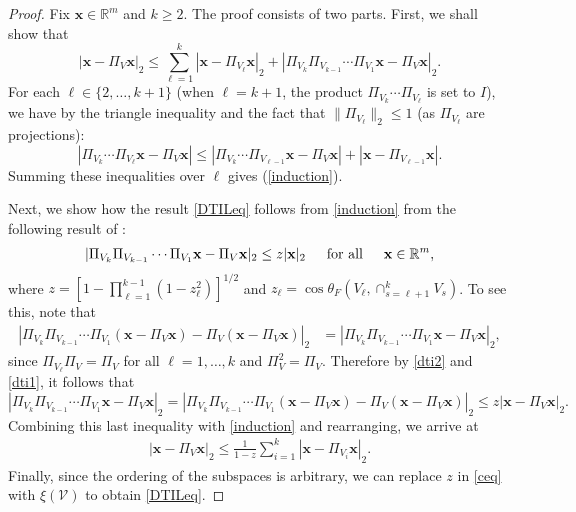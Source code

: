 \documentclass[journal, onecolumn]{IEEEtran}
\begin{document}
\begin{proof} 
Fix $\mathbf{x} \in \mathbb{R}^m$ and $k \geq 2$. The proof consists of two parts. First, we shall show that 
\begin{equation}\label{induction}
|\mathbf{x} - \Pi_V\mathbf{x}|_2 \leq \sum_{\ell=1}^k |\mathbf{x} - \Pi_{V_{\ell}} \mathbf{x}|_2 + |\Pi_{V_{k}}\Pi_{V_{k-1}}\cdots\Pi_{V_{1}} \mathbf{x} - \Pi_V \mathbf{x}|_2.
\end{equation}
For each $\ell \in \{2, \ldots, k+1\}$ (when $\ell = k+1$, the product $\Pi_{V_k} \cdots \Pi_{V_{\ell}}$ is set to $I$), we have by the triangle inequality and the fact that $\|\Pi_{V_{\ell}}\|_2 \leq 1$ (as $\Pi_{V_{\ell}}$ are projections):
\begin{equation}
|\Pi_{V_k} \cdots \Pi_{V_{\ell}}\mathbf{x} - \Pi_V \mathbf{x}|  \leq  |\Pi_{V_k} \cdots \Pi_{V_{\ell-1}}\mathbf{x} - \Pi_V \mathbf{x}| + 
|\mathbf{x} - \Pi_{V_{\ell-1}}\mathbf{x}|.
\end{equation}
Summing these inequalities over $\ell$ gives (\ref{induction}).

Next, we show how the result \eqref{DTILeq} follows from \eqref{induction} from the following result of \cite[Theorem 9.33]{Deutsch}:
\begin{align}\label{dti2}
|\Pi_{V_k}\Pi_{V_{k-1}}\cdots\Pi_{V_1} \mathbf{x} - \Pi_V\mathbf{x}|_2 \leq z |\mathbf{x}|_2 \indent \text{for all} \indent \mathbf{x} \in \mathbb{R}^m,
\end{align}
where $z= \left[1 - \prod_{\ell =1}^{k-1}(1-z_{\ell}^2)\right]^{1/2}$ and $z_{\ell} = \cos\theta_F\left(V_{\ell}, \cap_{s=\ell+1}^k V_s\right)$. To see this, note that
\begin{align}\label{dti1}
|\Pi_{V_k}\Pi_{V_{k-1}}\cdots\Pi_{V_1}(\mathbf{x} - \Pi_V\mathbf{x}) - \Pi_V(\mathbf{x} - \Pi_V\mathbf{x})|_2 
&= |\Pi_{V_k}\Pi_{V_{k-1}}\cdots\Pi_{V_1} \mathbf{x} - \Pi_V \mathbf{x} |_2,
\end{align}
since $\Pi_{V_\ell} \Pi_V = \Pi_V$ for all $\ell = 1, \ldots, k$ and $\Pi_V^2 = \Pi_V$.
Therefore by \eqref{dti2} and \eqref{dti1}, it follows that
\[|\Pi_{V_k}\Pi_{V_{k-1}}\cdots\Pi_{V_1} \mathbf{x} - \Pi_V \mathbf{x} |_2
= |\Pi_{V_k}\Pi_{V_{k-1}}\cdots\Pi_{V_1}(\mathbf{x} - \Pi_V\mathbf{x}) - \Pi_V(\mathbf{x} - \Pi_V\mathbf{x})|_2  \leq z |\mathbf{x} - \Pi_V\mathbf{x}|_2.\]
Combining this last inequality with \eqref{induction} and rearranging, we arrive at
\begin{align}\label{ceq}
|\mathbf{x} - \Pi_V \mathbf{x}|_2 \leq \frac{1}{1 - z} \sum_{i=1}^k |\mathbf{x} - \Pi_{V_i} \mathbf{x}|_2.
\end{align}
Finally, since the ordering of the subspaces is arbitrary, we can replace $z$ in \eqref{ceq} with $\xi(\mathcal{V})$ to obtain \eqref{DTILeq}.
\end{proof}
\end{document}
